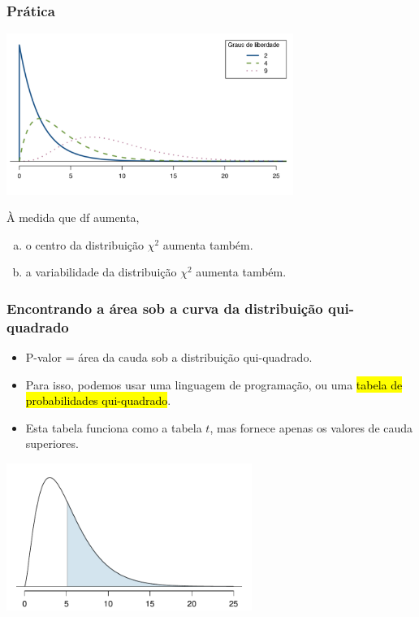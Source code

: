 \begin{frame}
\footnotesize
\frametitle{Prática}
\justifying
{}

\begin{center}
\includegraphics[width=0.7\textwidth]{6-3_chisq_gof/chiSquareDistributionWithInceasingDF.png}
\end{center}

À medida que df aumenta,
\begin{enumerate}[(a)]
\justifying
\item o centro da distribuição $\chi^2$ aumenta também.
\justifying
\item a variabilidade da distribuição $\chi^2$ aumenta também.
\justifying
{}
\end{enumerate}

\end{frame}


\begin{frame}[fragile]
\frametitle{Encontrando a área sob a curva da distribuição qui-quadrado}

\begin{itemize}
\justifying
\item P-valor = área da cauda sob a distribuição qui-quadrado.

\pause
\justifying
\item Para isso, podemos usar uma linguagem de programação, ou uma \hl{tabela de probabilidades qui-quadrado}.

\pause
\justifying
\item  Esta tabela funciona como a tabela $t$, mas fornece apenas os valores de cauda superiores.
\end{itemize}

\begin{center}
\includegraphics[width=0.6\textwidth]{6-3_chisq_gof/above5Point1WithDF5.pdf}
\end{center}

\end{frame}

